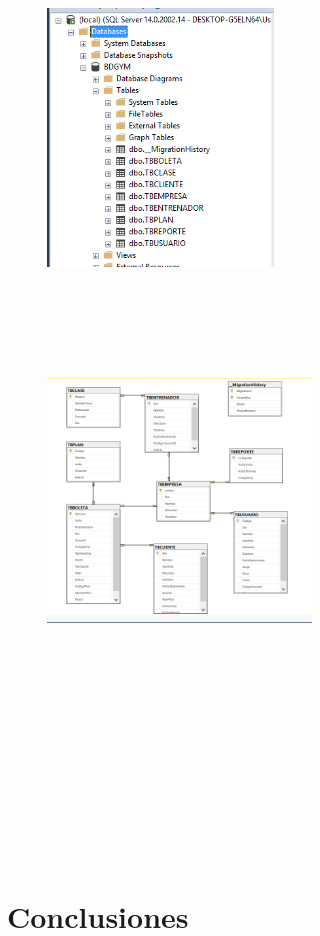 \documentclass[twoside,twocolumn]{article}
\begin{document}
\begin{itemize}
\begin{figure}[htb]
\begin{center}
\includegraphics[width=6cm]{./Imagenes/5-3}
\end{center}
\end{figure}
\\
\\
\\
\\
\begin{figure}[htb]
\begin{center}
\includegraphics[width=7cm]{./Imagenes/6}
\end{center}
\end{figure}
\\
\\
\\
\\
\\
\\
\\
\\
\\
\\
\\
\end{itemize}




\section{Conclusiones}
\end{document}
